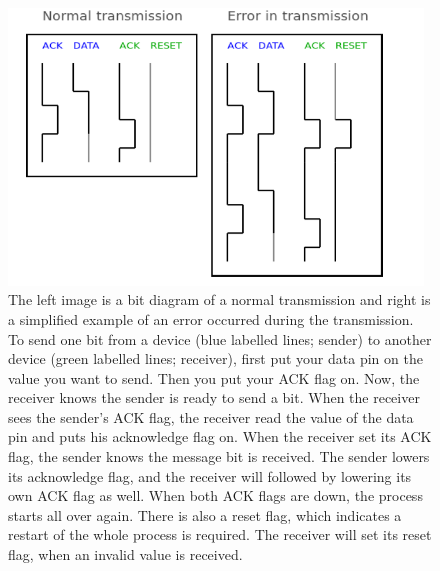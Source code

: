 \documentclass[a4paper,10pt]{article} %
\begin{document}
\begin{figure}[H]
\label{fig:handshaking}
\centering
\includegraphics[width=11cm]{img/handshaking.png}
\caption{The left image is a bit diagram of a normal transmission and right is a
simplified example of an error occurred during the transmission. To send one bit
from a device (blue labelled lines; sender) to another device (green labelled
lines; receiver), first put your data pin on the value you want to send. Then
you put your ACK flag on. Now, the receiver knows the sender is ready to send a
bit.  When the receiver sees the sender's ACK flag, the receiver read the value
of the data pin and puts his acknowledge flag on. When the receiver set its ACK
flag, the sender knows the message bit is received. The sender lowers its
acknowledge flag, and the receiver will followed by lowering its own ACK flag as
well. When both ACK flags are down, the process starts all over again. There is
also a reset flag, which indicates a restart of the whole process is required.
The receiver will set its reset flag, when an invalid value is received.}
\end{figure}
\end{document}
